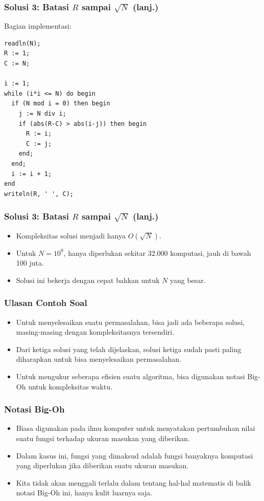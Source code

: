 \documentclass{beamer}
\begin{document}
\begin{frame}[fragile]
\frametitle{Solusi 3: Batasi $R$ sampai $\sqrt{N}$ (lanj.)}
Bagian implementasi:
\begin{lstlisting}
readln(N);
R := 1;
C := N;

i := 1;
while (i*i <= N) do begin
  if (N mod i = 0) then begin
    j := N div i;
    if (abs(R-C) > abs(i-j)) then begin
      R := i;
      C := j;
    end;
  end;
  i := i + 1;
end
writeln(R, ' ', C);
\end{lstlisting}
\end{frame}

\begin{frame}[fragile]
\frametitle{Solusi 3: Batasi $R$ sampai $\sqrt{N}$ (lanj.)}
\begin{itemize}
	\item Kompleksitas solusi menjadi hanya $O(\sqrt{N})$.
	\item Untuk $N = 10^9$, hanya diperlukan sekitar 32.000 komputasi, jauh di bawah 100 juta.
	\item Solusi ini bekerja dengan cepat bahkan untuk $N$ yang besar.
\end{itemize}
\end{frame}

\begin{frame}
\frametitle{Ulasan Contoh Soal}
\begin{itemize}
	\item Untuk menyelesaikan suatu permasalahan, bisa jadi ada beberapa solusi, masing-masing dengan kompleksitasnya tersendiri.
	\item Dari ketiga solusi yang telah dijelaskan, solusi ketiga sudah pasti paling diharapkan untuk bisa menyelesaikan permasalahan.
	\item Untuk mengukur seberapa efisien suatu algoritma, bisa digunakan notasi Big-Oh untuk kompleksitas waktu.
\end{itemize}
\end{frame}

\begin{frame}
\frametitle{Notasi Big-Oh}
\begin{itemize}
	\item Biasa digunakan pada ilmu komputer untuk menyatakan pertumbuhan nilai suatu fungsi terhadap ukuran masukan yang diberikan.
	\item Dalam kasus ini, fungsi yang dimaksud adalah fungsi banyaknya komputasi yang diperlukan jika diberikan suatu ukuran masukan.
	\item Kita tidak akan menggali terlalu dalam tentang hal-hal matematis di balik notasi Big-Oh ini, hanya kulit luarnya saja.
\end{itemize}
\end{frame}
\end{document}
